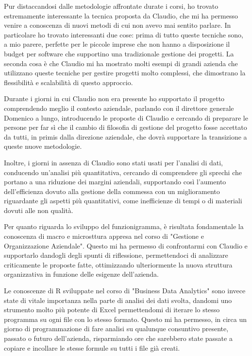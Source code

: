 \begin{multicols}{2}
	Pur distaccandosi dalle metodologie affrontate durate i corsi, ho trovato estremamente interessante la tecnica proposta da Claudio, che mi ha permesso venire a conoscenza di nuovi metodi di cui non avevo mai sentito parlare. In particolare ho trovato interessanti due cose: prima di tutto queste tecniche sono, a mio parere, perfette per le piccole imprese che non hanno a disposizione il budget per software che supportino una tradizionale gestione dei progetti. La seconda cosa è che Claudio mi ha mostrato molti esempi di grandi azienda che utilizzano queste tecniche per gestire progetti molto complessi, che dimostrano la flessibilità e scalabilità di questo approccio.

    Durante i giorni in cui Claudio non era presente ho supportato il progetto comprendendo meglio il contesto aziendale, parlando con il direttore generale Domenico a lungo, introducendo le proposte di Claudio e cercando di preparare le persone per far sì che il cambio di filosofia di gestione del progetto fosse accettato da tutti, in primis dalla direzione aziendale, che dovrà supportare la transizione a queste nuove metodologie.

    Inoltre, i giorni in assenza di Claudio sono stati usati per l'analisi di dati, conducendo un'analisi più quantitativa, cercando di comprendere gli sprechi che portano a una riduzione dei margini aziendali, supportando così l'aumento dell'efficienza dovuto alla gestione della commessa con un miglioramento riguardante gli aspetti più quantitativi, come inefficienze di tempi o di materiali dovuti alle non qualità. 

	Per quanto riguarda lo sviluppo del funzionigramma, è risultata fondamentale la conoscenza di macro e microsttura appresa nel corso di "Gestione e Organizzazione Aziendale". Questo mi ha permesso di confrontarmi con Claudio e supportarlo dandogli degli spunti di riflessione, permettendoci di analizzare criticamente le proposte fatte, ottimizzando ulteriormente la nuova struttura organizzativa in funzione delle esigenze dell'azienda.

	Le conoscenze di R sviluppate nel corso di "Business Data Analytics" sono invece state di vitale importanza nella parte di analisi dei dati svolta, dandomi uno strumento molto più potente di Excel permettendomi di iterare lo stesso programma su ogni file con lo stesso formato. Questo mi ha permesso, in circa un giorno di programmazione di fare analisi su qualunque consuntivo presente, passato o futuro dell'azienda, risparmiando ore che sarebbero state passate a copiare e incollare le stesse formule su tutti i file già creati.


\end{multicols}
